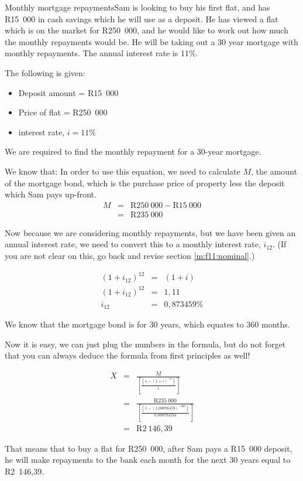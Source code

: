 \begin{wex}{Monthly mortgage repayments}{Sam is looking to buy his first flat, and has R15~000 in cash savings which he will use as a deposit. He has viewed a flat which is on the market for R250~000, and he would like to work out how much the monthly repayments would be. He will be taking out a 30 year mortgage with monthly repayments. The annual interest rate is 11\%.}
{
The following is given:
\begin{itemize}
\item{Deposit amount = R15~000}
\item{Price of flat = R250~000}
\item{interest rate, $i=11\%$}
\end{itemize}
We are required to find the monthly repayment for a 30-year mortgage.

We know that:
In order to use this equation, we need to calculate $M$, the amount of the mortgage bond, which is the purchase price of property less the deposit which Sam pays up-front.
\begin{eqnarray*}
M &=& \mbox{R}250~000 - \mbox{R}15~000\\
&=& \mbox{R}235~000
\end{eqnarray*}

Now because we are considering monthly repayments, but we have been given an annual interest rate, we need to convert this to a monthly interest rate, $i_{12}$. (If you are not clear on this, go back and revise section \ref{m:f11:nominal}.)

\begin{eqnarray*}
(1+ i_{12})^{12} &=& (1+i)\\
(1 + i_{12})^{12} &=& 1,11\\
i_{12} &=& 0,873459\%
\end{eqnarray*}

We know that the mortgage bond is for 30 years, which equates to 360 months.

Now it is easy, we can just plug the numbers in the formula, but do not forget that you can always deduce the formula from first principles as well!

\begin{eqnarray*}
X &=& \frac{M}{[\frac{(1-(1+i)^{-n})}{i}]}\\
&=& \frac{\mbox{R}235~000}{[\frac{(1-(1.00876459)^{-360})}{0,008734594}]}\\
&=& \mbox{R}2~146,39
\end{eqnarray*}

That means that to buy a flat for R250~000, after Sam pays a R15~000 deposit, he will make repayments to the bank each month for the next 30 years equal to R2~146,39.}
\end{wex}

